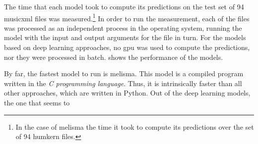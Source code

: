 
The time that each model took to compute its predictions on
the test set of 94 \gls{musicxml} files was
measured.\footnote{In the case of \gls{melisma} the time it
took to compute its predictions over the set of 94
\gls{humkern files}.} In order to run the measurement, each
of the files was processed as an independent process in the
operating system, running the model with the input and
output arguments for the file in turn. For the models based
on deep learning approaches, no \gls{gpu} was used to
compute the predictions, nor they were processed in batch.
 shows the performance of the
models.


By far, the fastest model to run is \gls{melisma}. This
model is a compiled program written in the \emph{C
programming language}. Thus, it is intrinsically faster than
all other approaches, which are written in Python. Out of
the deep learning models, the one that seems to 

